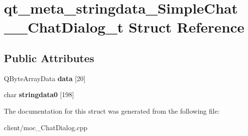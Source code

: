 \hypertarget{structqt__meta__stringdata__SimpleChat____ChatDialog__t}{\section{qt\-\_\-meta\-\_\-stringdata\-\_\-\-Simple\-Chat\-\_\-\-\_\-\-Chat\-Dialog\-\_\-t Struct Reference}
\label{structqt__meta__stringdata__SimpleChat____ChatDialog__t}
}
\subsection*{Public Attributes}
\begin{DoxyCompactItemize}
\item 
\hypertarget{structqt__meta__stringdata__SimpleChat____ChatDialog__t_a202ef2c15139cf2a3916cd81306aecff}{Q\-Byte\-Array\-Data {\bfseries data} \mbox{[}20\mbox{]}}\label{structqt__meta__stringdata__SimpleChat____ChatDialog__t_a202ef2c15139cf2a3916cd81306aecff}

\item 
\hypertarget{structqt__meta__stringdata__SimpleChat____ChatDialog__t_ae17c196e8972556825f525c256a3dcff}{char {\bfseries stringdata0} \mbox{[}198\mbox{]}}\label{structqt__meta__stringdata__SimpleChat____ChatDialog__t_ae17c196e8972556825f525c256a3dcff}

\end{DoxyCompactItemize}


The documentation for this struct was generated from the following file\-:\begin{DoxyCompactItemize}
\item 
client/moc\-\_\-\-Chat\-Dialog.\-cpp\end{DoxyCompactItemize}
